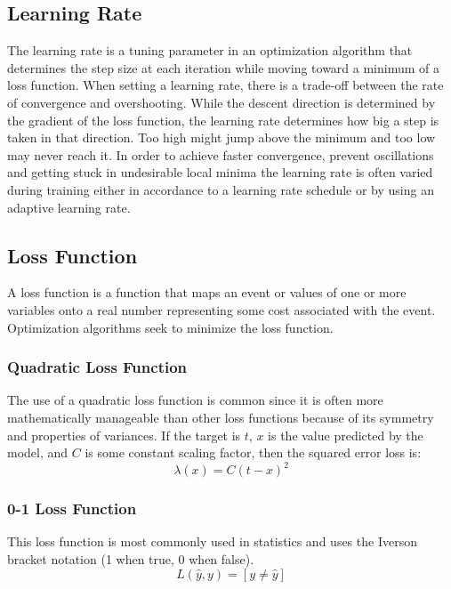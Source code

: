 \documentclass{article}
\begin{document}
\subsection{Learning Rate}
The learning rate is a tuning parameter in an optimization algorithm that determines the step size at each iteration 
while moving toward a minimum of a loss function. When setting a learning rate, there is a trade-off between the rate of 
convergence and overshooting. While the descent direction is determined by the gradient of the loss function, the learning 
rate determines how big a step is taken in that direction. Too high might jump above the minimum and too low may never reach 
it. In order to achieve faster convergence, prevent oscillations and getting stuck in undesirable local minima the 
learning rate is often varied during training either in accordance to a learning rate schedule or by using an adaptive 
learning rate.

\subsection{Loss Function}
A loss function is a function that maps an event or values of one or more variables onto a real number representing some 
cost associated with the event. Optimization algorithms seek to minimize the loss function. 
\subsubsection{Quadratic Loss Function}
The use of a quadratic loss function is common since it is often more mathematically manageable than other loss functions 
because of its symmetry and properties of variances. If the target is $t$, $x$ is the value predicted by the model, and $C$ is 
some constant scaling factor, then the squared error loss is:
\begin{equation}
	\lambda(x)=C(t-x)^2
	\label{eq:SEL}
\end{equation}

\subsubsection{0-1 Loss Function}
This loss function is most commonly used in statistics and uses the Iverson bracket notation (1 when true, 0 when false).
\begin{equation}
	L(\hat y, y)=[y\neq \hat y]
	\label{eq:01loss}
\end{equation}


\pagebreak
\end{document}
